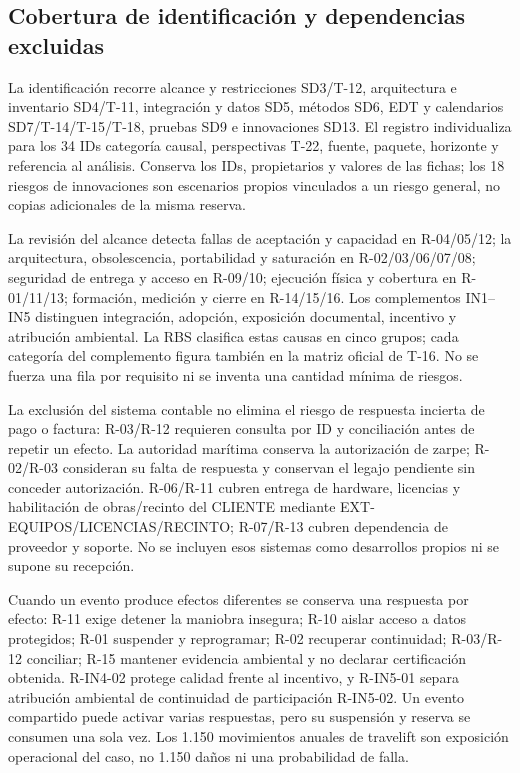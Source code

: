 \subsection{Cobertura de identificación y dependencias excluidas}\label{sec:sd8-cobertura-identificacion}
La identificación recorre alcance y restricciones SD3/T-12, arquitectura e inventario SD4/T-11, integración y datos SD5, métodos SD6, EDT y calendarios SD7/T-14/T-15/T-18, pruebas SD9 e innovaciones SD13. El registro  individualiza para los 34 IDs categoría causal, perspectivas T-22, fuente, paquete, horizonte y referencia al análisis. Conserva los IDs, propietarios y valores de las fichas; los 18 riesgos de innovaciones son escenarios propios vinculados a un riesgo general, no copias adicionales de la misma reserva.

La revisión del alcance detecta fallas de aceptación y capacidad en R-04/05/12; la arquitectura, obsolescencia, portabilidad y saturación en R-02/03/06/07/08; seguridad de entrega y acceso en R-09/10; ejecución física y cobertura en R-01/11/13; formación, medición y cierre en R-14/15/16. Los complementos IN1--IN5 distinguen integración, adopción, exposición documental, incentivo y atribución ambiental. La RBS clasifica estas causas en cinco grupos; cada categoría del complemento figura también en la matriz oficial de T-16. No se fuerza una fila por requisito ni se inventa una cantidad mínima de riesgos. \parencites[Formulario T-7, apartado 10; T-16; T-22; pp.~59, 63, 68]{sd8-ba}[cap.~8]{sd8-ex}

La exclusión del sistema contable no elimina el riesgo de respuesta incierta de pago o factura: R-03/R-12 requieren consulta por ID y conciliación antes de repetir un efecto. La autoridad marítima conserva la autorización de zarpe; R-02/R-03 consideran su falta de respuesta y conservan el legajo pendiente sin conceder autorización. R-06/R-11 cubren entrega de hardware, licencias y habilitación de obras/recinto del CLIENTE mediante EXT-EQUIPOS/LICENCIAS/RECINTO; R-07/R-13 cubren dependencia de proveedor y soporte. No se incluyen esos sistemas como desarrollos propios ni se supone su recepción. \parencite[cap.~11; numeral 17.1]{sd8-c07}

Cuando un evento produce efectos diferentes se conserva una respuesta por efecto: R-11 exige detener la maniobra insegura; R-10 aislar acceso a datos protegidos; R-01 suspender y reprogramar; R-02 recuperar continuidad; R-03/R-12 conciliar; R-15 mantener evidencia ambiental y no declarar certificación obtenida. R-IN4-02 protege calidad frente al incentivo, y R-IN5-01 separa atribución ambiental de continuidad de participación R-IN5-02. Un evento compartido puede activar varias respuestas, pero su suspensión y reserva se consumen una sola vez. Los 1.150 movimientos anuales de travelift son exposición operacional del caso, no 1.150 daños ni una probabilidad de falla.

